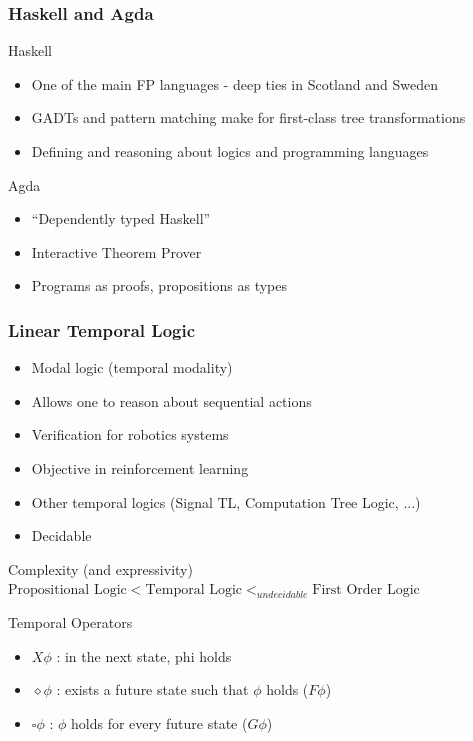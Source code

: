 \documentclass{beamer}
\begin{document}
\begin{frame}
\frametitle{Haskell and Agda}

\begin{exampleblock}{Haskell}
\begin{itemize}
\item One of the main FP languages - deep ties in Scotland and Sweden
\item GADTs and pattern matching make for first-class tree transformations
\item Defining and reasoning about logics and programming languages
\end{itemize}
\end{exampleblock}

\begin{exampleblock}{Agda}
\begin{itemize}
\item ``Dependently typed Haskell''
\item Interactive Theorem Prover
\item Programs as proofs, propositions as types
\end{itemize}

\end{exampleblock}
\end{frame}

\begin{frame}
\frametitle{Linear Temporal Logic}

\begin{itemize}
\item Modal logic (temporal modality)
\item Allows one to reason about sequential actions
\item Verification for robotics systems
\item Objective in reinforcement learning
\item Other temporal logics (Signal TL, Computation Tree Logic, ...)
\item Decidable 
\end{itemize}

\begin{block}{Complexity (and expressivity)}
$\text{Propositional Logic} < \text{Temporal Logic} <_{undecidable} \text{First Order Logic}$
\end{block}

\begin{exampleblock}{Temporal Operators}
\begin{itemize}
\item $X \phi$ : in the next state, phi holds
\item $\diamond \phi$ : exists a future state such that $\phi$ holds ($F \phi$)
\item $\square \phi$ : $\phi$ holds for every future state ($G \phi$)
\end{itemize}
\end{exampleblock}

\end{frame}
\end{document}
